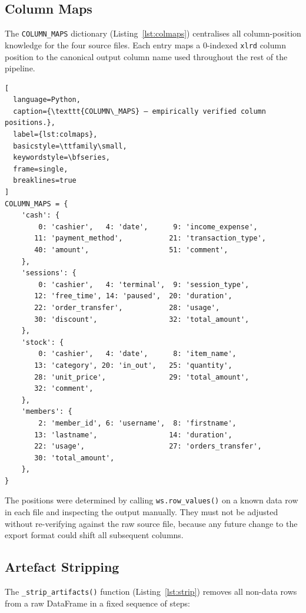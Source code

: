 \subsection{Column Maps}

The \texttt{COLUMN\_MAPS} dictionary (Listing~\ref{lst:colmaps}) centralises all
column-position knowledge for the four source files. Each entry maps a
0-indexed \texttt{xlrd} column position to the canonical output column name used
throughout the rest of the pipeline.

\begin{lstlisting}[
  language=Python,
  caption={\texttt{COLUMN\_MAPS} — empirically verified column positions.},
  label={lst:colmaps},
  basicstyle=\ttfamily\small,
  keywordstyle=\bfseries,
  frame=single,
  breaklines=true
]
COLUMN_MAPS = {
    'cash': {
        0: 'cashier',   4: 'date',      9: 'income_expense',
       11: 'payment_method',           21: 'transaction_type',
       40: 'amount',                   51: 'comment',
    },
    'sessions': {
        0: 'cashier',   4: 'terminal',  9: 'session_type',
       12: 'free_time', 14: 'paused',  20: 'duration',
       22: 'order_transfer',           28: 'usage',
       30: 'discount',                 32: 'total_amount',
    },
    'stock': {
        0: 'cashier',   4: 'date',      8: 'item_name',
       13: 'category', 20: 'in_out',   25: 'quantity',
       28: 'unit_price',               29: 'total_amount',
       32: 'comment',
    },
    'members': {
        2: 'member_id', 6: 'username',  8: 'firstname',
       13: 'lastname',                 14: 'duration',
       22: 'usage',                    27: 'orders_transfer',
       30: 'total_amount',
    },
}
\end{lstlisting}

The positions were determined by calling \texttt{ws.row\_values()} on a known
data row in each file and inspecting the output manually. They must not be
adjusted without re-verifying against the raw source file, because any future
change to the export format could shift all subsequent columns.

\subsection{Artefact Stripping}

The \texttt{\_strip\_artifacts()} function (Listing~\ref{lst:strip}) removes all
non-data rows from a raw DataFrame in a fixed sequence of steps:


